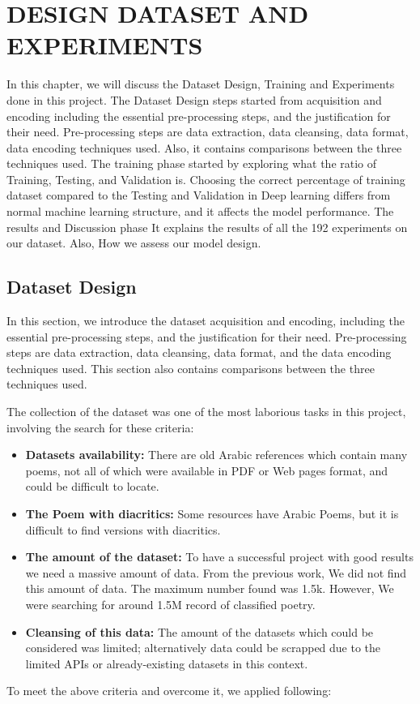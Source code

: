 \chapter{\uppercase{Design Dataset and Experiments}}\label{Ch:Model_Training}

In this chapter, we will discuss the Dataset Design, Training and Experiments done in this project. The Dataset Design steps started from acquisition and encoding including the essential pre-processing steps, and the justification for their need. Pre-processing steps are data extraction, data cleansing, data format, data encoding techniques used. Also, it contains comparisons between the three techniques used. The training phase started by exploring what the ratio of Training, Testing, and Validation is. Choosing the correct percentage of training dataset compared to the Testing and Validation in Deep learning differs from normal machine learning structure, and it affects the model performance. The results and Discussion phase It explains the results of all the 192 experiments on our dataset. Also, How we assess our model design.

\clearpage

\section{Dataset Design}

In this section, we introduce the dataset acquisition and encoding, including the essential pre-processing steps, and the justification for their need. Pre-processing steps are data extraction, data cleansing, data format, and the data encoding techniques used. This section also contains comparisons between the three techniques used.

The collection of the dataset was one of the most laborious tasks in this project, involving the search for these criteria:

\begin{itemize}
 
 \item \textbf{Datasets availability:} There are old Arabic references which contain many poems, not all of which were available in PDF or Web pages format, and could be difficult to locate.
 
 \item \textbf{The Poem with diacritics:} Some resources have Arabic Poems, but it is difficult to find versions with diacritics.
 
 \item \textbf{The amount of the dataset:} To have a successful project with good results we need a massive amount of data. From the previous work, We did not find this amount of data. The maximum number found was 1.5k. However, We were searching for around 1.5M record of classified poetry.

 
 \item \textbf{Cleansing of this data:} The amount of the datasets which could be considered was limited; alternatively data could be scrapped due to the limited APIs or already-existing datasets in this context.
 
\end{itemize}
To meet the above criteria and overcome it, we applied following:

